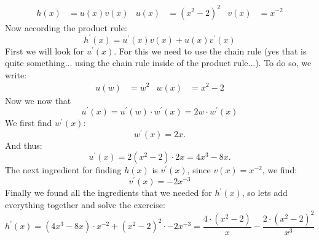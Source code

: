\documentclass[a4paper]{report}
\begin{document}
\begin{Answer}[ref=ex1]
\begin{equation*}
\end{equation*}
\begin{align*}
h(x) &= u(x) v(x) & u(x) &=(x^2-2)^2 & v(x) &=x^{-2} 
\end{align*}
Now according the product rule:
\begin{equation*}
h^\prime(x) = u^\prime(x) v(x) + u(x) v^\prime(x)
\end{equation*}
First we will look for $u^\prime(x)$. For this we need to use the chain rule (yes that is quite something... using the chain rule inside of the product rule...). To do so, we write:
\begin{align*}
u(w) &= w^2 & w(x)&=x^2-2
\end{align*}
Now we now that
\begin{equation*}
u^\prime(x)= u^\prime(w)\cdot w^\prime(x) = 2w\cdot w^\prime(x)
\end{equation*}
We first find $w^\prime(x)$:
\begin{equation*}
w^\prime(x)=2x.
\end{equation*}
And thus:
\begin{equation*}
u^\prime(x)=2(x^2-2)\cdot 2x =4x^3 -8x.
\end{equation*}
The next ingredient for finding $h(x)$ is $v^\prime(x)$, since $v(x)=x^{-2}$, we find:
\begin{equation*}
v^\prime(x) = -2x^{-3}
\end{equation*}
Finally we found all the ingredients that we needed for $h^\prime(x)$, so lets add everything together and solve the exercise:
\begin{equation*}
 h^\prime(x) = (4x^3-8x) \cdot x^{-2} + (x^2-2)^2 \cdot-2x^{-3}  = \frac{4 \cdot (x^2-2)} {x}-\frac{2\cdot (x^2-2)^2}{x^3}
\end{equation*}
\end{Answer}
\end{document}
